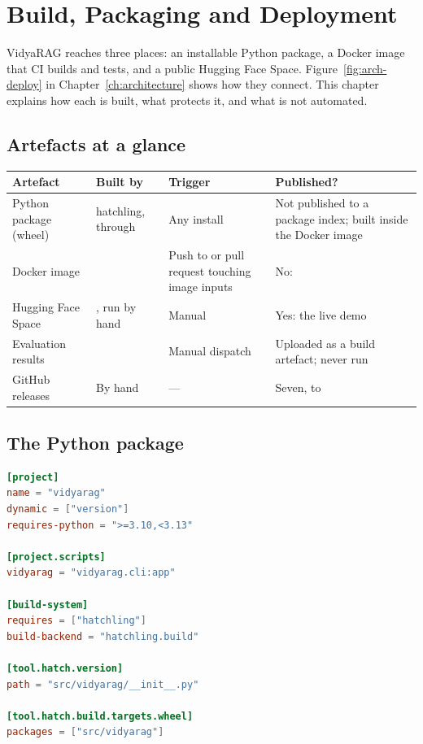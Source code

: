 \chapter{Build, Packaging and Deployment}
\label{ch:deploy}

VidyaRAG reaches three places: an installable Python package, a Docker image that CI builds and tests, and a public Hugging Face Space. Figure~\ref{fig:arch-deploy} in Chapter~\ref{ch:architecture} shows how they connect. This chapter explains how each is built, what protects it, and what is not automated.

\section{Artefacts at a glance}

\begin{center}
\begin{tabularx}{\textwidth}{@{}>{\raggedright\arraybackslash}p{3.3cm}>{\raggedright\arraybackslash}p{4.2cm}>{\raggedright\arraybackslash}p{3.0cm}L@{}}
\toprule
\textbf{Artefact} & \textbf{Built by} & \textbf{Trigger} & \textbf{Published?}\\
\midrule
Python package (wheel) & hatchling, through  & Any install & Not published to a package index; built inside the Docker image\\
Docker image &  & Push to  or pull request touching image inputs & No: \\
Hugging Face Space & , run by hand & Manual & Yes: the live demo\\
Evaluation results &  & Manual dispatch & Uploaded as a build artefact; never run\\
GitHub releases & By hand & --- & Seven,  to \\
\bottomrule
\end{tabularx}
\end{center}

\section{The Python package}

\begin{lstlisting}[language=toml]
[project]
name = "vidyarag"
dynamic = ["version"]
requires-python = ">=3.10,<3.13"

[project.scripts]
vidyarag = "vidyarag.cli:app"

[build-system]
requires = ["hatchling"]
build-backend = "hatchling.build"

[tool.hatch.version]
path = "src/vidyarag/__init__.py"

[tool.hatch.build.targets.wheel]
packages = ["src/vidyarag"]
\end{lstlisting}

